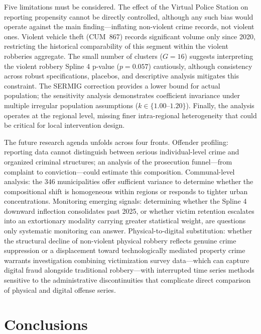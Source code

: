 \documentclass[pdflatex,sn-basic]{sn-jnl}
\begin{document}
Five limitations must be considered. The effect of the Virtual Police Station on reporting propensity cannot be directly controlled, although any such bias would operate against the main finding---inflating non-violent crime records, not violent ones. Violent vehicle theft (CUM~867) records significant volume only since 2020, restricting the historical comparability of this segment within the violent robberies aggregate. The small number of clusters ($G=16$) suggests interpreting the violent robbery Spline 4 p-value ($p=0.057$) cautiously, although consistency across robust specifications, placebos, and descriptive analysis mitigates this constraint. The SERMIG correction provides a lower bound for actual population; the sensitivity analysis demonstrates coefficient invariance under multiple irregular population assumptions ($k \in \{1.00\text{--}1.20\}$). Finally, the analysis operates at the regional level, missing finer intra-regional heterogeneity that could be critical for local intervention design.

The future research agenda unfolds across four fronts. Offender profiling: reporting data cannot distinguish between serious individual-level crime and organized criminal structures; an analysis of the prosecution funnel---from complaint to conviction---could estimate this composition. Communal-level analysis: the 346 municipalities offer sufficient variance to determine whether the compositional shift is homogeneous within regions or responds to tighter urban concentrations. Monitoring emerging signals: determining whether the Spline 4 downward inflection consolidates past 2025, or whether victim retention escalates into an extortionary modality carrying greater statistical weight, are questions only systematic monitoring can answer. Physical-to-digital substitution: whether the structural decline of non-violent physical robbery reflects genuine crime suppression or a displacement toward technologically mediated property crime warrants investigation combining victimization survey data---which can capture digital fraud alongside traditional robbery---with interrupted time series methods sensitive to the administrative discontinuities that complicate direct comparison of physical and digital offense series.

\section{Conclusions}
\label{sec:conclusiones}
\end{document}
